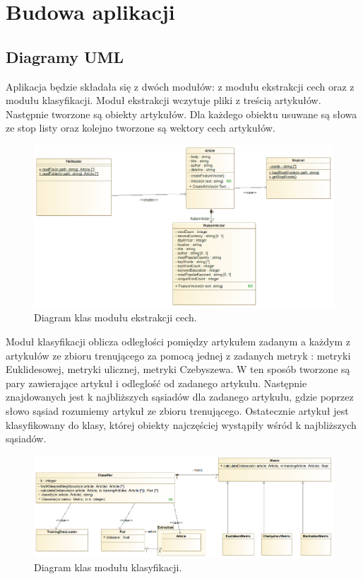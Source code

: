 \documentclass{classrep}
\begin{document}
\section{Budowa aplikacji}
\subsection{Diagramy UML}

Aplikacja będzie składała się z dwóch modułów: z modułu ekstrakcji cech oraz z modułu klasyfikacji. Moduł ekstrakcji wczytuje pliki z treścią artykułów. Następnie tworzone są obiekty artykułów. Dla każdego obiektu usuwane są słowa ze stop listy oraz kolejno tworzone są wektory cech artykułów. 

\begin{figure}[h!]
 \centering
 \includegraphics[width=14cm]{Ekstrakcja.png}
 \vspace{-0.3cm}
 \caption{Diagram klas modułu ekstrakcji cech. }
 \label{rysunek do eksperymentu 1 wariantu 1}
\end{figure}

Moduł klasyfikacji oblicza odległości pomiędzy artykułem zadanym a każdym z artykułów ze zbioru trenującego za pomocą jednej z zadanych metryk \cite{dane} : metryki Euklidesowej, metryki ulicznej, metryki Czebyszewa. W ten sposób tworzone są pary zawierające artykuł i odleglość od zadanego artykułu. Następnie znajdowanych jest k najbliższych sąsiadów dla zadanego artykułu, gdzie poprzez słowo sąsiad rozumiemy artykuł ze zbioru trenującego. Ostatecznie artykuł jest klasyfikowany do klasy, której obiekty najczęściej wystąpiły wśród k najbliższych sąsiadów. 

\begin{figure}[h!]
 \centering
 \includegraphics[width=14cm]{Klasyfikator.png}
 \vspace{-0.3cm}
 \caption{Diagram klas modułu klasyfikacji. }
 \label{rysunek do eksperymentu 1 wariantu 1}
\end{figure}
\end{document}
